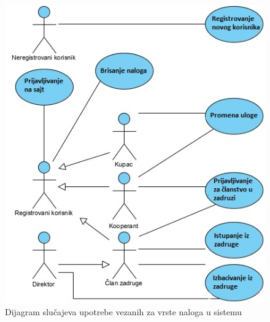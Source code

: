 \documentclass[a4paper, oneside]{article}
\begin{document}
\begin{figure}[h!]
    \centering
    \includegraphics{images/clanstvoSU.jpg}
    \caption{Dijagram slučajeva upotrebe vezanih za vrste naloga u sistemu}
    \label{slika1}
\end{figure}
\end{document}
